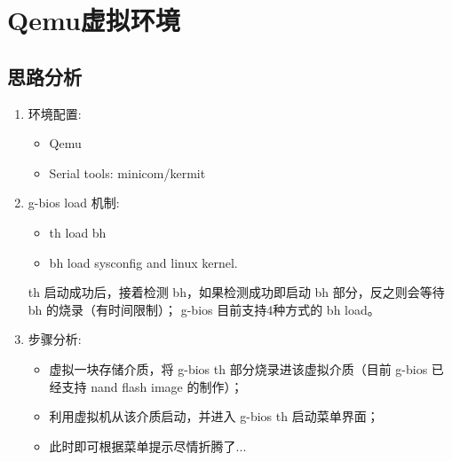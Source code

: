 \section{Qemu虚拟环境}

\subsection{思路分析}
\begin{enumerate}
	\item 环境配置:
	\begin{itemize}
		\item Qemu
		\item Serial tools: minicom/kermit
	\end{itemize}

	\item g-bios load 机制:
	\begin{itemize}
		\item th load bh
		\item bh load sysconfig and linux kernel.
	\end{itemize}
	th 启动成功后，接着检测 bh，如果检测成功即启动 bh 部分，反之则会等待 bh 的烧录（有时间限制）； g-bios 目前支持4种方式的 bh load。

	\item 步骤分析:
	\begin{itemize}
		\item 虚拟一块存储介质，将 g-bios th 部分烧录进该虚拟介质（目前 g-bios 已经支持 nand flash image 的制作）；
		\item 利用虚拟机从该介质启动，并进入 g-bios th 启动菜单界面；
		\item 此时即可根据菜单提示尽情折腾了...
	\end{itemize}
\end{enumerate}

